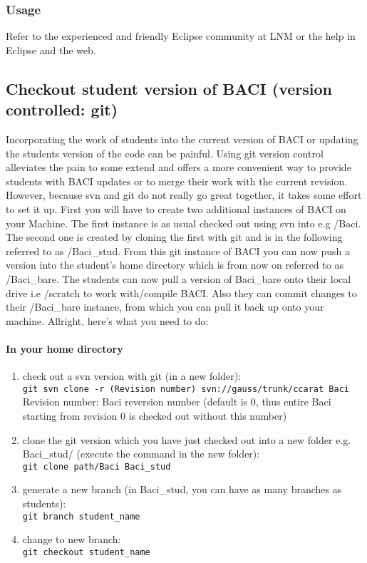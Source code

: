 \subsubsection{Usage}

Refer to the experienced and friendly Eclipse community at LNM or the help in Eclipse and the web.

\newpage

\subsection{Checkout student version of BACI (version controlled: git)}
Incorporating the work of students into the current version of BACI or updating the students version of the code can be painful. Using git version control alleviates the pain
to some extend and offers a more convenient way to provide students with BACI updates or to merge their work with the current revision.
However, because svn and git do not really go great together, it takes some effort to set it up. First you will have to create two additional instances of BACI on your Machine. The first instance is as usual
checked out using svn into e.g /Baci. The second one is created by cloning the first with git and is in the following referred to as /Baci\_stud. From this git instance
of BACI you can now push a version into the student's home directory which is from now on referred to as /Baci\_bare. The students can now pull a version of Baci\_bare onto their local 
drive i.e /scratch to work with/compile BACI. Also they can commit changes to their /Baci\_bare instance, from which you can pull it back up onto your machine.
Allright, here's what you need to do:

\paragraph{In your home directory}

\begin{enumerate}
  \item check out a svn version with git (in a new folder): \\
  \texttt{git svn clone -r (Revision number) svn://gauss/trunk/ccarat Baci} \\
  Revision number:  Baci reversion number (default is 0, thus entire Baci starting from revision 0 is checked out without this number)
  \item clone the git version which you have just checked out into a new folder e.g. Baci\_stud/ (execute the command in the new folder): \\
  \texttt{git clone path/Baci Baci\_stud}
  \item generate a new branch (in Baci\_stud, you can have as many branches as students): \\
  \texttt{git branch student\_name}
  \item change to new branch: \\
 \texttt{git checkout student\_name}
\end{enumerate}

